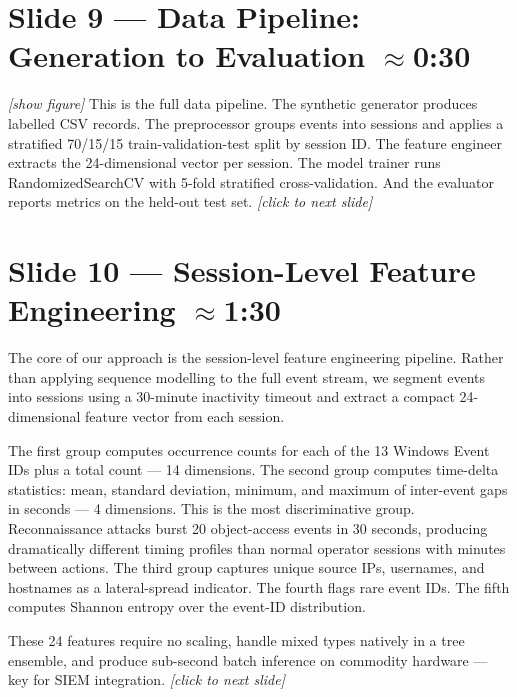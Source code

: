 \documentclass[14pt]{article}
\begin{document}
\section*{Slide 9 — Data Pipeline: Generation to Evaluation \hfill \normalfont\small $\approx$0:30}

\textit{[show figure]} This is the full data pipeline. The synthetic generator produces labelled CSV records. The preprocessor groups events into sessions and applies a stratified 70/15/15 train-validation-test split by session ID. The feature engineer extracts the 24-dimensional vector per session. The model trainer runs RandomizedSearchCV with 5-fold stratified cross-validation. And the evaluator reports metrics on the held-out test set. \textit{[click to next slide]}

\section*{Slide 10 — Session-Level Feature Engineering \hfill \normalfont\small $\approx$1:30}

The core of our approach is the session-level feature engineering pipeline. Rather than applying sequence modelling to the full event stream, we segment events into sessions using a 30-minute inactivity timeout and extract a compact 24-dimensional feature vector from each session.

The first group computes occurrence counts for each of the 13 Windows Event IDs plus a total count --- 14 dimensions. The second group computes time-delta statistics: mean, standard deviation, minimum, and maximum of inter-event gaps in seconds --- 4 dimensions. This is the most discriminative group. Reconnaissance attacks burst 20 object-access events in 30 seconds, producing dramatically different timing profiles than normal operator sessions with minutes between actions. The third group captures unique source IPs, usernames, and hostnames as a lateral-spread indicator. The fourth flags rare event IDs. The fifth computes Shannon entropy over the event-ID distribution.

These 24 features require no scaling, handle mixed types natively in a tree ensemble, and produce sub-second batch inference on commodity hardware --- key for SIEM integration. \textit{[click to next slide]}
\end{document}
